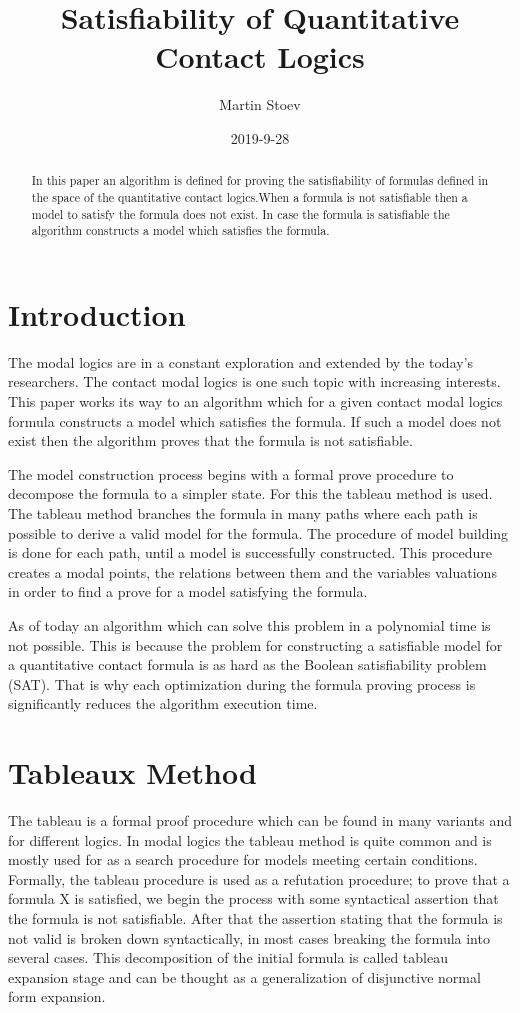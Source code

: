 \documentclass{article}
\title{Satisfiability of Quantitative Contact Logics}
\date{2019-9-28}
\author{Martin Stoev}
\begin{document}
	\maketitle
 	\thispagestyle{empty}
	\newpage

	\tableofcontents

	\newpage
\begin{abstract}
	In this paper an algorithm is defined for proving the satisfiability of formulas defined in the space of the quantitative contact logics.When a formula is not satisfiable then a model to satisfy the formula does not exist. In case the formula is satisfiable the algorithm constructs a model which satisfies the formula.
\end{abstract}
	\section{Introduction}
	The modal logics are in a constant exploration and extended by the today's researchers. The contact modal logics is one such topic with increasing interests. This paper works its way to an algorithm which for a given contact modal logics formula constructs a model which satisfies the formula. If such a model does not exist then the algorithm proves that the formula is not satisfiable. 

The model construction process begins with a formal prove procedure to decompose the formula to a simpler state. For this the tableau method is used. The tableau method branches the formula in many paths where each path is possible to derive a valid model for the formula. The procedure of model building is done for each path, until a model is successfully constructed. This procedure creates a modal points, the relations between them and the variables valuations in order to find a prove for a model satisfying the formula. 

As of today an algorithm which can solve this problem in a polynomial time is not possible. This is because the problem for constructing a satisfiable model for a quantitative contact formula is as hard as the Boolean satisfiability problem (SAT). That is why each optimization during the formula proving process is significantly reduces the algorithm execution time.

	\newpage
	\section{Tableaux Method}
	The tableau is a formal proof procedure which can be found in many variants and for different logics. In modal logics the tableau method is quite common and is mostly used for as a search procedure for models meeting certain conditions.
Formally, the tableau procedure is used as a refutation procedure; to prove that a formula X is satisfied, we begin the process with some syntactical assertion that the formula is not satisfiable. After that the assertion stating that the formula is not valid is broken down syntactically, in most cases breaking the formula into several cases. This decomposition of the initial formula is called tableau expansion stage and can be thought as a generalization of disjunctive normal form expansion. 
\end{document}
